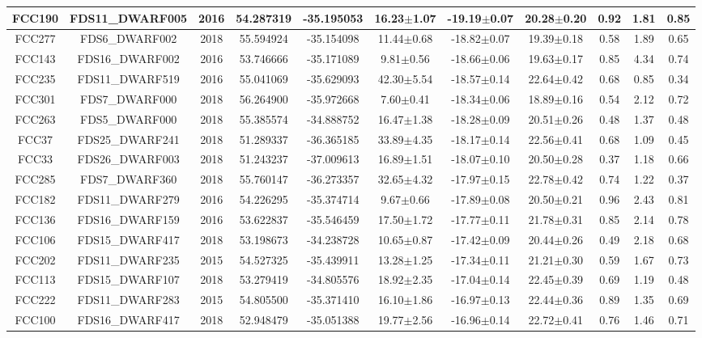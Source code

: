 \documentclass{aa}
\begin{document}
\begin{table}
\begin{center}
{{\begin{tabular}{|ccccccccccc|}
FCC190 & FDS11\_DWARF005 & 2016 & 54.287319 & -35.195053 & 16.23$\pm$1.07 & -19.19$\pm$0.07 & 20.28$\pm$0.20 & 0.92 & 1.81 & 0.85\\
\hline
FCC277 & FDS6\_DWARF002 & 2018 & 55.594924 & -35.154098 & 11.44$\pm$0.68 & -18.82$\pm$0.07 & 19.39$\pm$0.18 & 0.58 & 1.89 & 0.65\\
FCC143 & FDS16\_DWARF002 & 2016 & 53.746666 & -35.171089 & 9.81$\pm$0.56 & -18.66$\pm$0.06 & 19.63$\pm$0.17 & 0.85 & 4.34 & 0.74\\
FCC235 & FDS11\_DWARF519 & 2016 & 55.041069 & -35.629093 & 42.30$\pm$5.54 & -18.57$\pm$0.14 & 22.64$\pm$0.42 & 0.68 & 0.85 & 0.34\\
FCC301 & FDS7\_DWARF000 & 2018 & 56.264900 & -35.972668 & 7.60$\pm$0.41 & -18.34$\pm$0.06 & 18.89$\pm$0.16 & 0.54 & 2.12 & 0.72\\
FCC263 & FDS5\_DWARF000 & 2018 & 55.385574 & -34.888752 & 16.47$\pm$1.38 & -18.28$\pm$0.09 & 20.51$\pm$0.26 & 0.48 & 1.37 & 0.48\\
FCC37 & FDS25\_DWARF241 & 2018 & 51.289337 & -36.365185 & 33.89$\pm$4.35 & -18.17$\pm$0.14 & 22.56$\pm$0.41 & 0.68 & 1.09 & 0.45\\
FCC33 & FDS26\_DWARF003 & 2018 & 51.243237 & -37.009613 & 16.89$\pm$1.51 & -18.07$\pm$0.10 & 20.50$\pm$0.28 & 0.37 & 1.18 & 0.66\\
FCC285 & FDS7\_DWARF360 & 2018 & 55.760147 & -36.273357 & 32.65$\pm$4.32 & -17.97$\pm$0.15 & 22.78$\pm$0.42 & 0.74 & 1.22 & 0.37\\
FCC182 & FDS11\_DWARF279 & 2016 & 54.226295 & -35.374714 & 9.67$\pm$0.66 & -17.89$\pm$0.08 & 20.50$\pm$0.21 & 0.96 & 2.43 & 0.81\\
FCC136 & FDS16\_DWARF159 & 2016 & 53.622837 & -35.546459 & 17.50$\pm$1.72 & -17.77$\pm$0.11 & 21.78$\pm$0.31 & 0.85 & 2.14 & 0.78\\
FCC106 & FDS15\_DWARF417 & 2018 & 53.198673 & -34.238728 & 10.65$\pm$0.87 & -17.42$\pm$0.09 & 20.44$\pm$0.26 & 0.49 & 2.18 & 0.68\\
FCC202 & FDS11\_DWARF235 & 2015 & 54.527325 & -35.439911 & 13.28$\pm$1.25 & -17.34$\pm$0.11 & 21.21$\pm$0.30 & 0.59 & 1.67 & 0.73\\
FCC113 & FDS15\_DWARF107 & 2018 & 53.279419 & -34.805576 & 18.92$\pm$2.35 & -17.04$\pm$0.14 & 22.45$\pm$0.39 & 0.69 & 1.19 & 0.48\\
FCC222 & FDS11\_DWARF283 & 2015 & 54.805500 & -35.371410 & 16.10$\pm$1.86 & -16.97$\pm$0.13 & 22.44$\pm$0.36 & 0.89 & 1.35 & 0.69\\
FCC100 & FDS16\_DWARF417 & 2018 & 52.948479 & -35.051388 & 19.77$\pm$2.56 & -16.96$\pm$0.14 & 22.72$\pm$0.41 & 0.76 & 1.46 & 0.71\\

\end{tabular}}}
\end{center}
\end{table}
\end{document}

